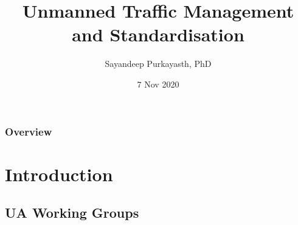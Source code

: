 \documentclass[usenames,dvipsnames,aspectratio=169,serif]{beamer}
\title[UTM \& Stdn.]{Unmanned Traffic Management and Standardisation} %
\author{Sayandeep Purkayasth, PhD} %
\institute[UAWGs] %
{
   \href{mailto:sayandeep@deepcyan.ai}{sayandeep@deepcyan.ai}  \\ %
   \medskip
   Unmanned Aviation Working Groups
   \footnote{\tiny \faLink \, https://groups.google.com/forum/\#!forum/utm-wg} %
   \footnote{\tiny \faEnvelope[regular] utm-wg@googlegroups.com} %
   \footnote{\tiny \faGit \, https://github.com/utm-working-group} %
}
\date{7 Nov 2020} %
\begin{document}
\begin{frame}
   \titlepage %
\end{frame}

\begin{frame}
   \frametitle{Overview} %
   \tableofcontents %
\end{frame}


\section{Introduction} %

\subsection{UA Working Groups} %
\end{document}

